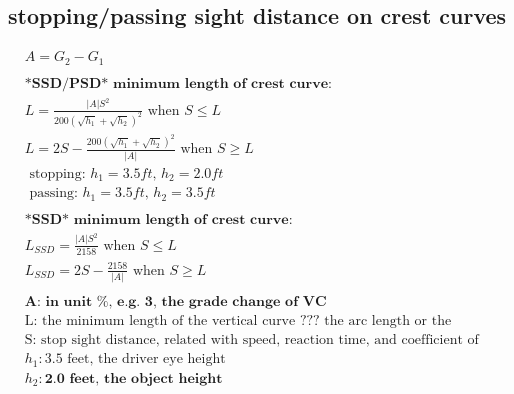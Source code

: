 \documentclass{article}
\begin{document}
  \subsection{stopping/passing sight distance on crest curves}
  \begin{align*}
    & A = G_2 - G_1 \\
    \\
    & \textbf{*SSD/PSD* minimum length of crest curve:} \\
    & L = \frac{|A|S^2}{200(\sqrt{h_1} + \sqrt{h_2})^2}  \text{   when } S \leq L \\
    & L = 2S - \frac{200(\sqrt{h_1} + \sqrt{h_2})^2}{|A|}  \text{  when } S \geq L \\
    & \text{ stopping: $h_1 = 3.5ft$,  $h_2 = 2.0 ft$ } \\
    & \text{ passing: $h_1 = 3.5ft$,  $h_2 = 3.5ft$} \\
    \\
    & \textbf{*SSD* minimum length of crest curve:} \\
    & L_{SSD} = \frac{|A|S^2}{2158} \text{   when } S \leq L \\
    & L_{SSD} = 2S - \frac{2158}{|A|} \text{  when } S \geq L \\
    \\
    & \textbf{A: in unit \%, e.g. 3, the grade change of VC}\\
    & \text{L: the minimum length of the vertical curve ??? the arc length or the horizontal segment length???}\\
    & \text{S: stop sight distance, related with speed, reaction time, and coefficient of friction} \\
    & h_1: \text{3.5 feet, the driver eye height} \\
    & h_2: \textbf{2.0 feet, the object height} \\
  \end{align*}
\end{document}
